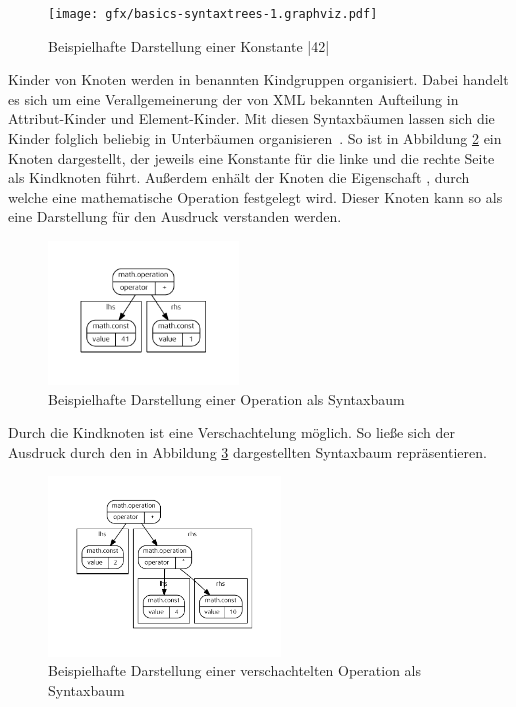 \begin{figure}[h]
  \centering
  \texttt{[image: gfx/basics-syntaxtrees-1.graphviz.pdf]}
  \caption{Beispielhafte Darstellung einer Konstante \inlinec|42|}
  \label{fig:basics:syntaxtrees:1}
\end{figure}

Kinder von Knoten werden in benannten Kindgruppen organisiert. Dabei handelt es sich um eine Verallgemeinerung der von XML bekannten Aufteilung in Attribut-Kinder und Element-Kinder. Mit diesen Syntaxbäumen lassen sich die Kinder folglich beliebig in Unterbäumen organisieren~\cite[4]{riemer2018}. So ist in Abbildung \ref{fig:basics:syntaxtrees:2} ein Knoten  dargestellt, der jeweils eine Konstante für die linke und die rechte Seite als Kindknoten führt. Außerdem enhält der Knoten die Eigenschaft , durch welche eine mathematische Operation festgelegt wird. Dieser Knoten kann so als eine Darstellung für den Ausdruck  verstanden werden.

\begin{figure}[h]
  \centering
  \includegraphics[width=0.45\textwidth]{gfx/basics-syntaxtrees-2.graphviz.pdf}
  \caption{Beispielhafte Darstellung einer Operation als Syntaxbaum}
  \label{fig:basics:syntaxtrees:2}
\end{figure}

Durch die Kindknoten ist eine Verschachtelung möglich. So ließe sich der Ausdruck  durch den in Abbildung \ref{fig:basics:syntaxtrees:3} dargestellten Syntaxbaum repräsentieren.

\begin{figure}[h]
  \centering
  \includegraphics[width=0.55\textwidth]{gfx/basics-syntaxtrees-3.graphviz.pdf}
  \caption{Beispielhafte Darstellung einer verschachtelten Operation als Syntaxbaum}
  \label{fig:basics:syntaxtrees:3}
\end{figure}

